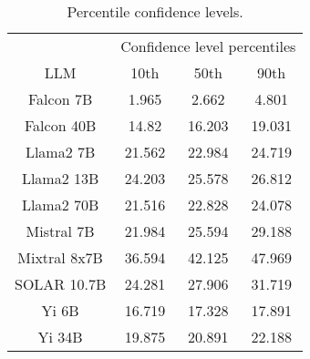 \begin{table*}
\centering
\begin{tabular}{c|c|c|c}
& \multicolumn{3}{c}{Confidence level percentiles} \\ 
LLM & 10th & 50th & 90th\\ \hline
Falcon 7B & 1.965 & 2.662 & 4.801\\
Falcon 40B & 14.82 & 16.203 & 19.031\\
Llama2 7B & 21.562 & 22.984 & 24.719\\
Llama2 13B & 24.203 & 25.578 & 26.812\\
Llama2 70B & 21.516 & 22.828 & 24.078\\
Mistral 7B & 21.984 & 25.594 & 29.188\\
Mixtral 8x7B & 36.594 & 42.125 & 47.969\\
SOLAR 10.7B & 24.281 & 27.906 & 31.719\\
Yi 6B & 16.719 & 17.328 & 17.891\\
Yi 34B & 19.875 & 20.891 & 22.188\\
\hline
\end{tabular}
\caption{Percentile confidence levels.}
\label{tab:percentile_conf}
\end{table*}
